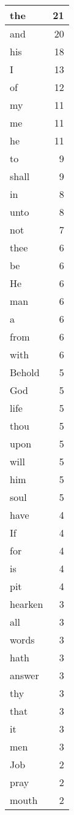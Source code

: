 \begin{center}
\begin{longtable}{l|r}
\hline \hline
\endlastfoot
the & 21 \\ \hline
and & 20 \\ \hline
his & 18 \\ \hline
I & 13 \\ \hline
of & 12 \\ \hline
my & 11 \\ \hline
me & 11 \\ \hline
he & 11 \\ \hline
to & 9 \\ \hline
shall & 9 \\ \hline
in & 8 \\ \hline
unto & 8 \\ \hline
not & 7 \\ \hline
thee & 6 \\ \hline
be & 6 \\ \hline
He & 6 \\ \hline
man & 6 \\ \hline
a & 6 \\ \hline
from & 6 \\ \hline
with & 6 \\ \hline
Behold & 5 \\ \hline
God & 5 \\ \hline
life & 5 \\ \hline
thou & 5 \\ \hline
upon & 5 \\ \hline
will & 5 \\ \hline
him & 5 \\ \hline
soul & 5 \\ \hline
have & 4 \\ \hline
If & 4 \\ \hline
for & 4 \\ \hline
is & 4 \\ \hline
pit & 4 \\ \hline
hearken & 3 \\ \hline
all & 3 \\ \hline
words & 3 \\ \hline
hath & 3 \\ \hline
answer & 3 \\ \hline
thy & 3 \\ \hline
that & 3 \\ \hline
it & 3 \\ \hline
men & 3 \\ \hline
Job & 2 \\ \hline
pray & 2 \\ \hline
mouth & 2 \\ \hline

\end{longtable}
\end{center}
